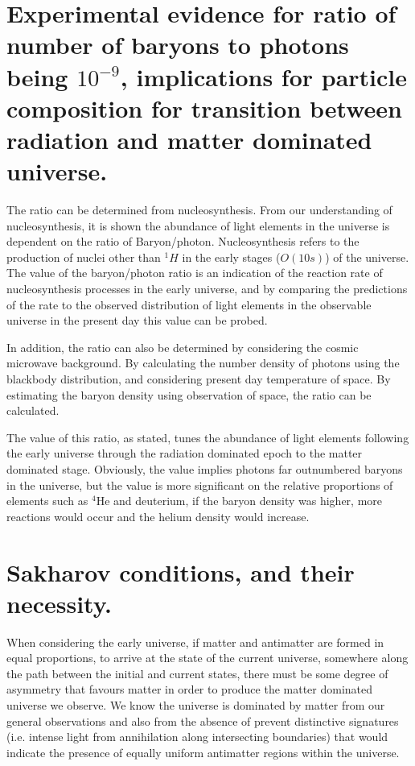 \documentclass[]{article}
\begin{document}
\large

\section{ Experimental evidence for ratio of number of baryons to photons being $10^{-9}$, implications for particle composition for transition between radiation and matter dominated universe.}

	The ratio can be determined from nucleosynthesis. From our understanding of nucleosynthesis, it is shown the abundance of light elements in the universe is dependent on the ratio of Baryon/photon. Nucleosynthesis refers to the production of nuclei other than $^1H$ in the early stages ($O(10s)$) of the universe. The value of the baryon/photon ratio is an indication of the reaction rate of nucleosynthesis processes in the early universe, and by comparing the predictions of the rate to the observed distribution of light elements in the observable universe in the present day this value can be probed.
	
	In addition, the ratio can also be determined by considering the cosmic microwave background. By calculating the number density of photons using the blackbody distribution, and considering present day temperature of space. By estimating the baryon density using observation of space, the ratio can be calculated.
	
	The value of this ratio, as stated, tunes the abundance of light elements following the early universe through the radiation dominated epoch to the matter dominated stage. Obviously, the value implies photons far outnumbered baryons in the universe, but the value is more significant on the relative proportions of elements such as $^4$He and deuterium, if the baryon density was higher, more reactions would occur and the helium density would increase.
	
\section{Sakharov conditions, and their necessity.}

	When considering the early universe, if matter and antimatter are formed in equal proportions, to arrive at the state of the current universe, somewhere along the path between the initial and current states, there must be some degree of asymmetry that favours matter in order to produce the matter dominated universe we observe. We know the universe is dominated by matter from our general observations and also from the absence of prevent distinctive signatures (i.e. intense light from annihilation along intersecting boundaries) that would indicate the presence of equally uniform antimatter regions within the universe.
	
\end{document}
